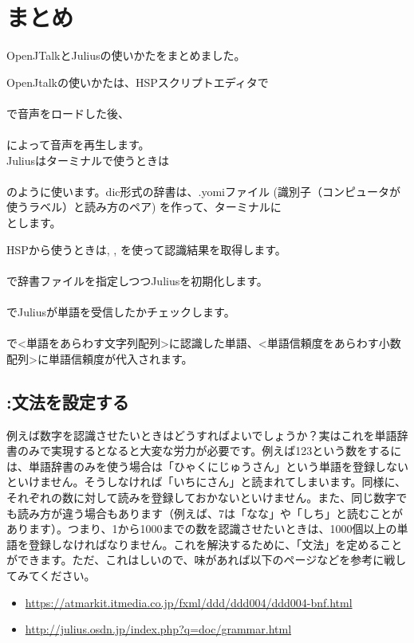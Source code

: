 \documentclass[text06.tex]{subfiles}
\begin{document}
\newpage
\section{まとめ}
OpenJTalkとJuliusの使いかたをまとめました。

OpenJtalkの使いかたは、HSPスクリプトエディタで\\
\\
で音声をロードした後、\\
\\
によって音声を再生します。\\

Juliusはターミナルで使うときは\\
\\
のように使います。dic形式の辞書は、.yomiファイル (識別子（コンピュータが使うラベル）と読み方のペア) を作って、ターミナルに\\
とします。

HSPから使うときは, ,  を使って認識結果を取得します。\\
\\
で辞書ファイルを指定しつつJuliusを初期化します。\\
\\
でJuliusが単語を受信したかチェックします。\\
\\
で<単語をあらわす文字列配列>に認識した単語、<単語信頼度をあらわす小数配列>に単語信頼度が代入されます。

\subsection{:文法を設定する}
例えば数字を認識させたいときはどうすればよいでしょうか？実はこれを単語辞書のみで実現するとなると大変な労力が必要です。例えば123という数をするには、単語辞書のみを使う場合は「ひゃくにじゅうさん」という単語を登録しないといけません。そうしなければ「いちにさん」と読まれてしまいます。同様に、それぞれの数に対して読みを登録しておかないといけません。また、同じ数字でも読み方が違う場合もあります（例えば、7は「なな」や「しち」と読むことがあります）。つまり、1から1000までの数を認識させたいときは、1000個以上の単語を登録しなければなりません。これを解決するために、「文法」を定めることができます。ただ、これはしいので、味があれば以下のページなどを参考に戦してみてください。
\begin{itemize}
\item \url{https://atmarkit.itmedia.co.jp/fxml/ddd/ddd004/ddd004-bnf.html}
\item \url{http://julius.osdn.jp/index.php?q=doc/grammar.html}
\end{itemize}
\end{document}
